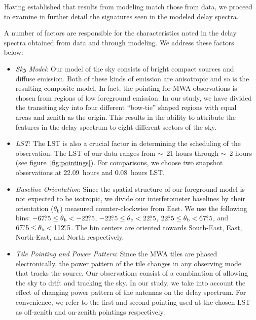 \documentclass[preprint2,iop,numberedappendix]{emulateapj}
\begin{document}
Having established that results from modeling match those from data, we proceed to examine in further detail the signatures seen in the modeled delay spectra. 

A number of factors are responsible for the characteristics noted in the delay spectra obtained from data and through modeling. We address these factors below:
\begin{itemize}

\item {\it Sky Model}: Our model of the sky consists of bright compact sources and diffuse emission. Both of these kinds of emission are anisotropic and so is the resulting composite model. In fact, the pointing for MWA observations is chosen from regions of low foreground emission. In our study, we have divided the transiting sky into four different ``bow-tie'' shaped regions with equal areas and zenith as the origin. This results in the ability to attribute the features in the delay spectrum to eight different sectors of the sky.

\item {\it LST}: The LST is also a crucial factor in determining the scheduling of the observation. The LST of our data ranges from $\sim$~21 hours through $\sim$~2 hours (see figure~\ref{fig:pointings}). For comparisons, we choose two snapshot observations at 22.09~hours and 0.08~hours LST.

\item {\it Baseline Orientation}: Since the spatial structure of our foreground model is not expected to be isotropic, we divide our interferometer baselines by their orientation ($\theta_\textrm{b}$) measured counter-clockwise from East. We use the following bins: $-67\mbox{$.\!\!^\circ$} 5\le \theta_\textrm{b} < -22\mbox{$.\!\!^\circ$} 5$, $-22\mbox{$.\!\!^\circ$} 5\le \theta_\textrm{b} < 22\mbox{$.\!\!^\circ$} 5$, $22\mbox{$.\!\!^\circ$} 5\le \theta_\textrm{b} < 67\mbox{$.\!\!^\circ$} 5$, and $67\mbox{$.\!\!^\circ$} 5\le \theta_\textrm{b} < 112\mbox{$.\!\!^\circ$} 5$. The bin centers are oriented towards South-East, East, North-East, and North respectively. 

\item {\it Tile Pointing and Power Pattern}: Since the MWA tiles are phased electronically, the power pattern of the tile changes in any observing mode that tracks the source. Our observations consist of a combination of allowing the sky to drift and tracking the sky. In our study, we take into account the effect of changing power pattern of the antennas on the delay spectrum. For convenience, we refer to the first and second pointing used at the chosen LST as off-zenith and on-zenith pointings respectively.


\end{itemize}
\end{document}
